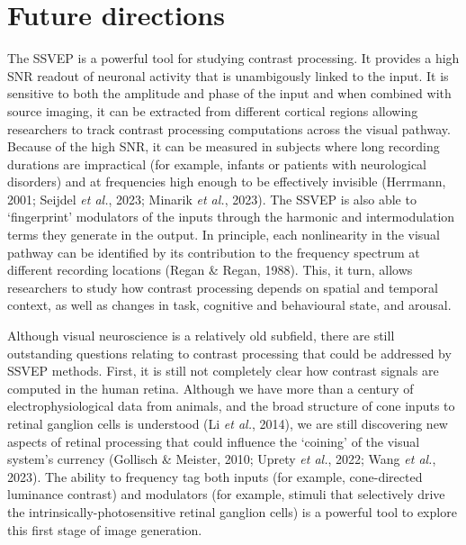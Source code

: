 \documentclass[
  letterpaper,
  DIV=11,
  numbers=noendperiod]{scrartcl}
\begin{document}
\section{Future directions}\label{future-directions}

The SSVEP is a powerful tool for studying contrast processing. It
provides a high SNR readout of neuronal activity that is unambigously
linked to the input. It is sensitive to both the amplitude and phase of
the input and when combined with source imaging, it can be extracted
from different cortical regions allowing researchers to track contrast
processing computations across the visual pathway. Because of the high
SNR, it can be measured in subjects where long recording durations are
impractical (for example, infants or patients with neurological
disorders) and at frequencies high enough to be effectively invisible
(Herrmann, 2001; Seijdel \emph{et al.}, 2023; Minarik \emph{et al.},
2023). The SSVEP is also able to `fingerprint' modulators of the inputs
through the harmonic and intermodulation terms they generate in the
output. In principle, each nonlinearity in the visual pathway can be
identified by its contribution to the frequency spectrum at different
recording locations (Regan \& Regan, 1988). This, it turn, allows
researchers to study how contrast processing depends on spatial and
temporal context, as well as changes in task, cognitive and behavioural
state, and arousal.

Although visual neuroscience is a relatively old subfield, there are
still outstanding questions relating to contrast processing that could
be addressed by SSVEP methods. First, it is still not completely clear
how contrast signals are computed in the human retina. Although we have
more than a century of electrophysiological data from animals, and the
broad structure of cone inputs to retinal ganglion cells is understood
(Li \emph{et al.}, 2014), we are still discovering new aspects of
retinal processing that could influence the `coining' of the visual
system's currency (Gollisch \& Meister, 2010; Uprety \emph{et al.},
2022; Wang \emph{et al.}, 2023). The ability to frequency tag both
inputs (for example, cone-directed luminance contrast) and modulators
(for example, stimuli that selectively drive the
intrinsically-photosensitive retinal ganglion cells) is a powerful tool
to explore this first stage of image generation.
\end{document}
